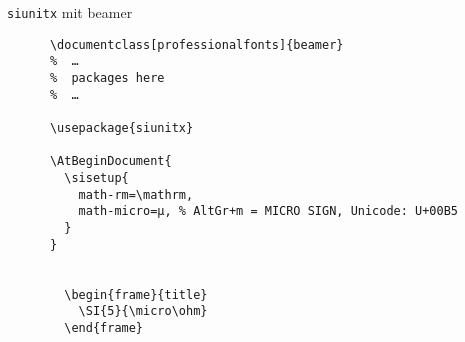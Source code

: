 \begin{frame}[fragile]{\texttt{siunitx} mit beamer}
  \begin{center}
    \begin{lstlisting}
      \documentclass[professionalfonts]{beamer}
      %  …
      %  packages here
      %  …

      \usepackage{siunitx}

      \AtBeginDocument{
        \sisetup{
          math-rm=\mathrm,
          math-micro=µ, % AltGr+m = MICRO SIGN, Unicode: U+00B5
        }
      }

      
        \begin{frame}{title}
          \SI{5}{\micro\ohm}
        \end{frame}
      
    \end{lstlisting}
  \end{center}
\end{frame}
